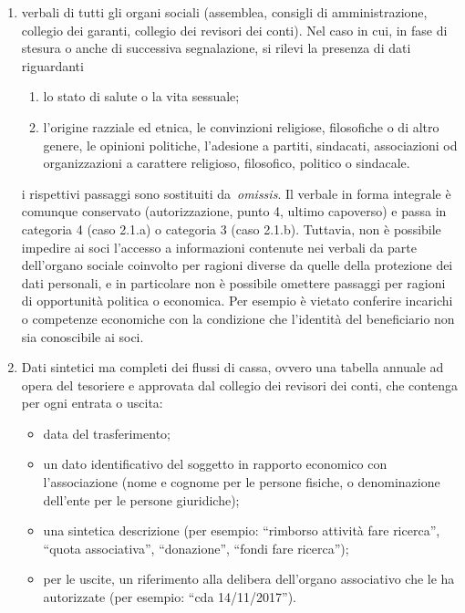 \begin{enumerate}
    \item
        verbali di tutti gli organi sociali (assemblea, consigli di
        amministrazione, collegio dei garanti, collegio dei revisori dei
        conti). Nel caso in cui, in fase di stesura o anche di successiva
        segnalazione, si rilevi la presenza di dati riguardanti
        \begin{enumerate}
            \item lo stato di salute o la vita sessuale;
            \item l'origine razziale ed etnica, le
                convinzioni religiose, filosofiche o di altro genere, le opinioni
                politiche, l'adesione a partiti, sindacati, associazioni od
                organizzazioni a carattere religioso, filosofico, politico o
                sindacale.
        \end{enumerate}
        i rispettivi passaggi sono sostituiti da~\emph{omissis}. Il verbale in
        forma integrale è comunque conservato (autorizzazione, punto 4, ultimo
        capoverso) e passa in categoria 4 (caso 2.1.a) o categoria 3 (caso
        2.1.b). Tuttavia, non è possibile impedire ai soci l'accesso a
        informazioni contenute nei verbali da parte dell'organo sociale
        coinvolto per ragioni diverse da quelle della protezione dei dati
        personali, e in particolare non è possibile omettere passaggi per
        ragioni di opportunità politica o economica. Per esempio è vietato
        conferire incarichi o competenze economiche con la condizione che
        l'identità del beneficiario non sia conoscibile ai soci.
    \item
        Dati sintetici ma completi dei flussi di cassa, ovvero una tabella
        annuale ad opera del tesoriere e approvata dal collegio dei revisori
        dei conti, che contenga per ogni entrata o uscita:
        \begin{itemize}
            \item data del trasferimento;
            \item un dato identificativo del soggetto in rapporto economico con l'associazione (nome e cognome per le persone fisiche, o denominazione dell'ente per le persone giuridiche);
            \item una sintetica descrizione (per esempio: ``rimborso attività fare ricerca'', ``quota associativa'', ``donazione'', ``fondi fare ricerca'');
            \item per le uscite, un riferimento alla delibera dell'organo associativo che le ha autorizzate (per esempio: ``cda 14/11/2017'').

\end{itemize}
\end{enumerate}
